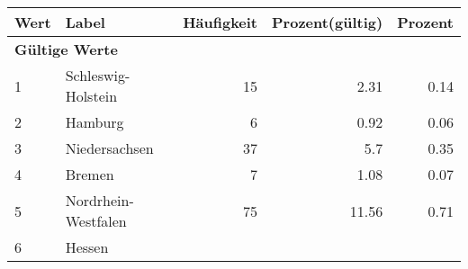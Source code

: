      \begin{longtable}{lXrrr}
     \toprule
     \textbf{Wert} & \textbf{Label} & \textbf{Häufigkeit} & \textbf{Prozent(gültig)} & \textbf{Prozent} \\
     \endhead
     \midrule
     \multicolumn{5}{l}{\textbf{Gültige Werte}}\\

     1 &
     \multicolumn{1}{X}{ Schleswig-Holstein   } &


       \num{15} &
       \num[round-mode=places,round-precision=2]{2,31} &
         \num[round-mode=places,round-precision=2]{0,14} \\

     2 &
     \multicolumn{1}{X}{ Hamburg   } &


       \num{6} &
       \num[round-mode=places,round-precision=2]{0,92} &
         \num[round-mode=places,round-precision=2]{0,06} \\

     3 &
     \multicolumn{1}{X}{ Niedersachsen   } &


       \num{37} &
       \num[round-mode=places,round-precision=2]{5,7} &
         \num[round-mode=places,round-precision=2]{0,35} \\

     4 &
     \multicolumn{1}{X}{ Bremen   } &


       \num{7} &
       \num[round-mode=places,round-precision=2]{1,08} &
         \num[round-mode=places,round-precision=2]{0,07} \\

     5 &
     \multicolumn{1}{X}{ Nordrhein-Westfalen   } &


       \num{75} &
       \num[round-mode=places,round-precision=2]{11,56} &
         \num[round-mode=places,round-precision=2]{0,71} \\

     6 &
     \multicolumn{1}{X}{ Hessen   } &



\end{longtable}
